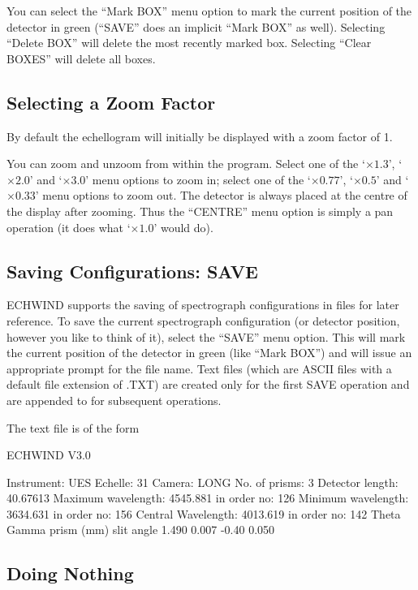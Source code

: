 \documentclass[11pt,nolof,noabs]{starlink}
\begin{document}
You can select the ``Mark BOX'' menu option to mark the current position of the
detector in green (``SAVE'' does an implicit ``Mark BOX'' as well). Selecting
``Delete BOX'' will delete the most recently marked box. Selecting ``Clear
BOXES'' will delete all boxes.

\subsection{Selecting a Zoom Factor}

By default the echellogram will initially be displayed with a zoom factor of 1.

You can zoom and unzoom from within the program. Select one of the `$
\times  1.3$', `$ \times 2.0$' and `$ \times 3.0$' menu options to zoom in;
select one of the `$ \times 0.77$', `$ \times 0.5$' and `$ \times 0.33$'
menu options to zoom out. The detector is always placed at the centre of
the display after zooming. Thus the ``CENTRE'' menu option is simply a pan
operation (it does what `$ \times 1.0$' would do).

\subsection{Saving Configurations: SAVE}

ECHWIND supports the saving of spectrograph configurations in files for
later reference. To save the current spectrograph configuration (or
detector position, however you like to think of it), select the ``SAVE''
menu option. This will mark the current position of the detector in green
(like ``Mark BOX'') and will issue an appropriate prompt for the file name.
Text files (which are ASCII files with a default file extension of
.TXT) are created only for the first SAVE operation and are appended to for
subsequent operations.

The text file is of the form
\begin{terminalv}
ECHWIND V3.0

  Instrument: UES
  Echelle: 31
  Camera: LONG
  No. of prisms:            3
  Detector length:    40.67613
  Maximum wavelength:    4545.881      in order no:          126
  Minimum wavelength:    3634.631      in order no:          156
  Central Wavelength:    4013.619      in order no:          142
       Theta        Gamma    prism (mm)   slit angle
      1.490        0.007       -0.40        0.050
\end{terminalv}

\subsection{Doing Nothing}
\end{document}

